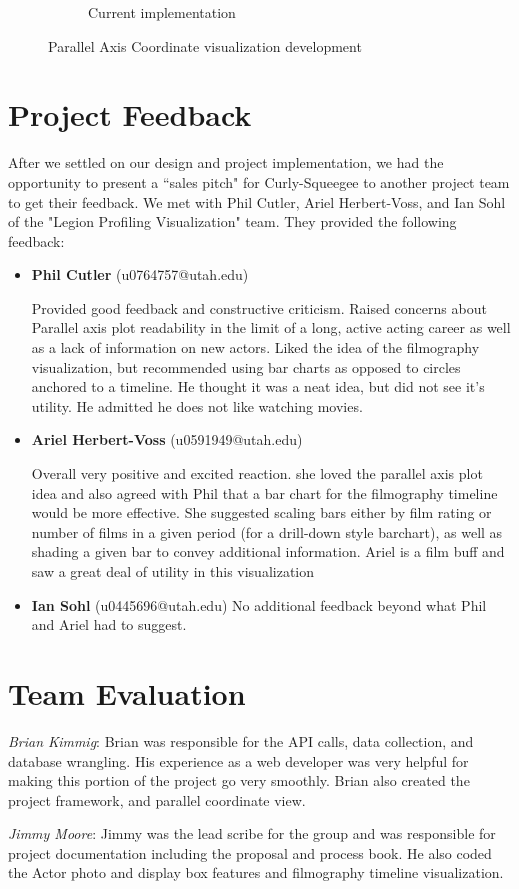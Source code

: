 \documentclass[12pt]{article}
\begin{document}
\begin{figure}[h!]
\begin{subfigure}[t]{.8\textwidth}
			  \caption{Current implementation}
			  \label{fig:sub2}
		\end{subfigure}%
		\caption{Parallel Axis Coordinate visualization development}
		\label{fig:parallelAxisCoordVis}
	\end{figure}

\newpage

\section{Project Feedback}

After we settled on our design and project implementation, we had the opportunity to present a ``sales pitch"  for Curly-Squeegee to another project team to get their feedback.  We met with Phil Cutler, Ariel Herbert-Voss, and Ian Sohl of the "Legion Profiling Visualization" team. They provided the following feedback:

\begin{itemize}
	\item \textbf{Phil Cutler} (u0764757@utah.edu)
	
	Provided good feedback and constructive criticism. Raised concerns about Parallel axis plot readability in the limit of a long, active acting career as well as a lack of information on new actors. Liked the idea of the filmography visualization, but recommended using bar charts as opposed to circles anchored to a timeline. He thought it was a neat idea, but did not see it's utility. He admitted he does not like watching movies.
	
	
	\item \textbf{Ariel Herbert-Voss} (u0591949@utah.edu)
	
	Overall very positive and excited reaction. she loved the parallel axis plot idea and also agreed with Phil that a bar chart for the filmography timeline would be more effective. She suggested scaling bars either by film rating or number of films in a given period (for a drill-down style barchart), as well as shading a given bar to convey additional information. Ariel is a film buff and saw a great deal of utility in this visualization
	
	\item \textbf{Ian Sohl} (u0445696@utah.edu)
		No additional feedback beyond what Phil and Ariel had to suggest.
\end{itemize}

\newpage

\section{Team Evaluation}

\textit{Brian Kimmig}: Brian was responsible for the API calls, data collection, and database wrangling. His experience as a web developer was very helpful for making this portion of the project go very smoothly. Brian also created the project framework, and parallel coordinate view.

\textit{Jimmy Moore}: Jimmy was the lead scribe for the group and was responsible for project documentation including the proposal and process book. He also coded the Actor photo and display box features and filmography timeline visualization.
\end{document}
